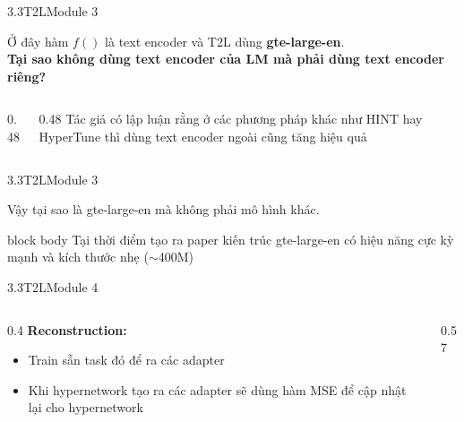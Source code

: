\begin{frame}{3.3\quad T2L}{Module 3}
  \centering{}\par
  \vspace{0.3em}\raggedright
  Ở đây hàm $f()$ là text encoder và T2L dùng \textbf{gte-large-en}.\\
  \textbf{Tại sao không dùng text encoder của LM mà phải dùng text encoder riêng?}
  \vspace{0.5em}
  \begin{columns}[c,onlytextwidth]
    \begin{column}{0.48\textwidth}
      \centering{}
    \end{column}
    \begin{column}{0.48\textwidth}
      Tác giả có lập luận rằng ở các phương pháp khác như HINT hay HyperTune thì dùng text
      encoder ngoài cũng tăng hiệu quả
    \end{column}
  \end{columns}
\end{frame}

\begin{frame}{3.3\quad T2L}{Module 3}
  \centering{}\par
  \vspace{1em}\raggedright
  Vậy tại sao là gte-large-en mà không phải mô hình khác.
  \vspace{0.4em}
  \begin{beamercolorbox}[wd=\linewidth,sep=0.6em]{block body}
    Tại thời điểm tạo ra paper kiến trúc gte-large-en có hiệu năng cực kỳ mạnh và kích
    thước nhẹ ($\sim$400M)
  \end{beamercolorbox}
\end{frame}

\begin{frame}{3.3\quad T2L}{Module 4}
  \vspace{0.8em}
  \begin{columns}[c,onlytextwidth]
    \begin{column}{0.4\textwidth}
      \textbf{Reconstruction:}
      \begin{itemize}\setlength{\itemsep}{0.4em}
        \item Train sẵn task đó để ra các adapter
        \item Khi hypernetwork tạo ra các adapter sẽ dùng hàm MSE để cập nhật lại cho
              hypernetwork
      \end{itemize}
    \end{column}
    \begin{column}{0.57\textwidth}
      \centering{}
    \end{column}
  \end{columns}
\end{frame}

